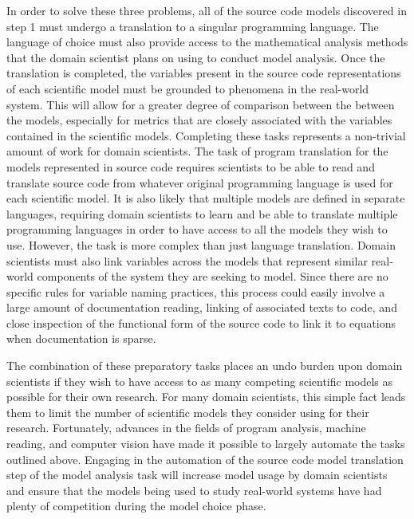 In order to solve these three problems, all of the source code models discovered in step 1 must undergo a translation to a singular programming language.
The language of choice must also provide access to the mathematical analysis methods that the domain scientist plans on using to conduct model analysis.
Once the translation is completed, the variables present in the source code representations of each scientific model must be grounded to phenomena in the real-world system.
This will allow for a greater degree of comparison between the between the models, especially for metrics that are closely associated with the variables contained in the scientific models.
Completing these tasks represents a non-trivial amount of work for domain scientists.
The task of program translation for the models represented in source code requires scientists to be able to read and translate source code from whatever original programming language is used for each scientific model.
It is also likely that multiple models are defined in separate languages, requiring domain scientists to learn and be able to translate multiple programming languages in order to have access to all the models they wish to use.
However, the task is more complex than just language translation.
Domain scientists must also link variables across the models that represent similar real-world components of the system they are seeking to model.
Since there are no specific rules for variable naming practices, this process could easily involve a large amount of documentation reading, linking of associated texts to code, and close inspection of the functional form of the source code to link it to equations when documentation is sparse.

The combination of these preparatory tasks places an undo burden upon domain scientists if they wish to have access to as many competing scientific models as possible for their own research.
For many domain scientists, this simple fact leads them to limit the number of scientific models they consider using for their research.
Fortunately, advances in the fields of program analysis, machine reading, and computer vision have made it possible to largely automate the tasks outlined above.
Engaging in the automation of the source code model translation step of the model analysis task will increase model usage by domain scientists and ensure that the models being used to study real-world systems have had plenty of competition during the model choice phase.


